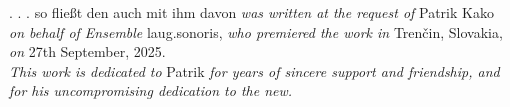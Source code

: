 \documentclass[12pt]{article}
\begin{document}
\vspace*{25\baselineskip}

\begingroup
\begin{center}
. . . so fließt den auch mit ihm davon \textit{was written at the request of} Patrik Kako \textit{on behalf of Ensemble} laug.sonoris, \textit{who premiered the work in} Trenčin, Slovakia, \textit{on} 27th September, 2025. \\
\textit{This work is dedicated to } Patrik \textit{for years of sincere support and friendship, and for his uncompromising dedication to the new.} 
\end{center}
\endgroup
\end{document}
